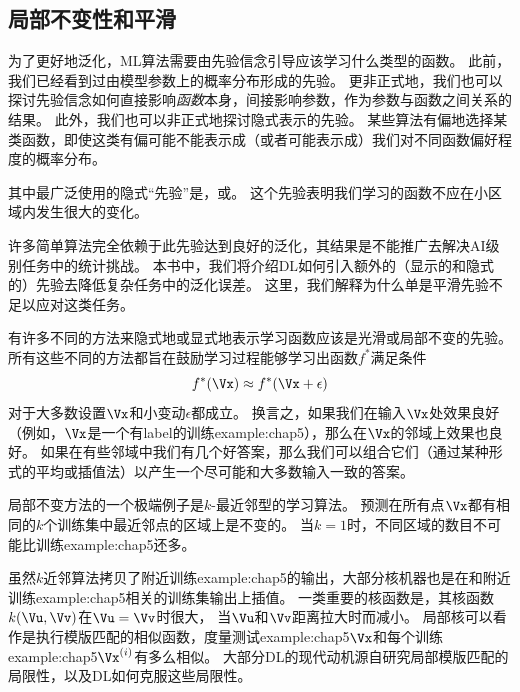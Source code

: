 
\subsection{局部不变性和平滑}
\label{sec:local_constancy_and_smoothness_regularization}
为了更好地泛化，\gls{ML}算法需要由先验信念引导应该学习什么类型的函数。
此前，我们已经看到过由模型参数上的概率分布形成的先验。
更非正式地，我们也可以探讨先验信念如何直接影响\emph{函数}本身，间接影响参数，作为参数与函数之间关系的结果。 
此外，我们也可以非正式地探讨隐式表示的先验。
某些算法有偏地选择某类函数，即使这类有偏可能不能表示成（或者可能表示成）我们对不同函数偏好程度的概率分布。


其中最广泛使用的隐式``先验''是，或。
这个先验表明我们学习的函数不应在小区域内发生很大的变化。

许多简单算法完全依赖于此先验达到良好的泛化，其结果是不能推广去解决\gls{AI}级别任务中的统计挑战。
本书中，我们将介绍\gls{DL}如何引入额外的（显示的和隐式的）先验去降低复杂任务中的泛化误差。
这里，我们解释为什么单是平滑先验不足以应对这类任务。

有许多不同的方法来隐式地或显式地表示学习函数应该是光滑或局部不变的先验。
所有这些不同的方法都旨在鼓励学习过程能够学习出函数$f^*$满足条件
\begin{equation}
    f^*(\Vx) \approx f^*(\Vx + \epsilon)
\end{equation}
对于大多数设置$\Vx$和小变动$\epsilon$都成立。
换言之，如果我们在输入$\Vx$处效果良好（例如，$\Vx$是一个有\gls{label}的训练\gls{example:chap5}），那么在$\Vx$的邻域上效果也良好。
如果在有些邻域中我们有几个好答案，那么我们可以组合它们（通过某种形式的平均或插值法）以产生一个尽可能和大多数输入一致的答案。

局部不变方法的一个极端例子是$k$-最近邻型的学习算法。
预测在所有点$\Vx$都有相同的$k$个训练集中最近邻点的区域上是不变的。
当$k=1$时，不同区域的数目不可能比训练\gls{example:chap5}还多。

虽然$k$近邻算法拷贝了附近训练\gls{example:chap5}的输出，大部分核机器也是在和附近训练\gls{example:chap5}相关的训练集输出上插值。
一类重要的核函数是，其核函数$k(\Vu,\Vv)$在$\Vu=\Vv$时很大，
当$\Vu$和$\Vv$距离拉大时而减小。
局部核可以看作是执行模版匹配的相似函数，度量测试\gls{example:chap5}$\Vx$和每个训练\gls{example:chap5}$\Vx^{(i)}$有多么相似。
大部分\gls{DL}的现代动机源自研究局部模版匹配的局限性，以及\gls{DL}如何克服这些局限性\citep{NIPS2005_424}。

